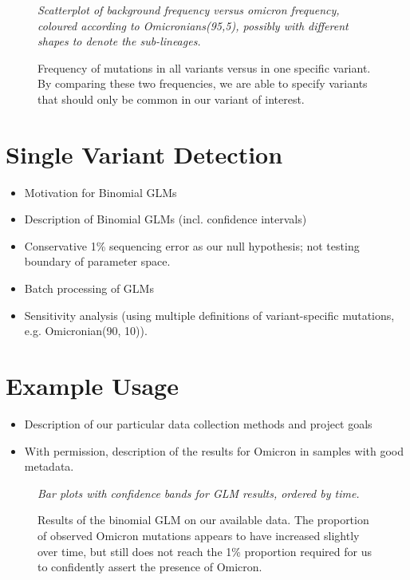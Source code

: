 \documentclass{article}
\newenvironment{tightemize}
{ \begin{itemize}
    \setlength{\itemsep}{0pt}
    \setlength{\parskip}{0pt}
    \setlength{\parsep}{0pt}     }
{ \end{itemize}                  }
\begin{document}
\begin{figure}[ht!]
\vspace{2cm}
\centering
\emph{Scatterplot of background frequency versus omicron frequency, coloured according to Omicronians(95,5), possibly with different shapes to denote the sub-lineages.}
\vspace{2cm}
\caption{Frequency of mutations in all variants versus in one specific variant. By comparing these two frequencies, we are able to specify variants that should only be common in our variant of interest.}
\label{fig:mutation_frequency}
\end{figure}






\section{Single Variant Detection}

\begin{tightemize}
    \item Motivation for Binomial GLMs
    \item Description of Binomial GLMs (incl. confidence intervals)
    \item Conservative 1\% sequencing error as our null hypothesis; not testing boundary of parameter space.
    \item Batch processing of GLMs
    \item Sensitivity analysis (using multiple definitions of variant-specific mutations, e.g. Omicronian(90, 10)).
\end{tightemize}






\section{Example Usage}

\begin{tightemize}
    \item Description of our particular data collection methods and project goals
    \item With permission, description of the results for Omicron in samples with good metadata.
\end{tightemize}

\begin{figure}[ht!]
\vspace{2cm}
\centering
\emph{Bar plots with confidence bands for GLM results, ordered by time.}
\vspace{2cm}
\caption{Results of the binomial GLM on our available data. The proportion of observed Omicron mutations appears to have increased slightly over time, but still does not reach the 1\% proportion required for us to confidently assert the presence of Omicron.}
\label{fig:binomial_results}
\end{figure}
\end{document}
